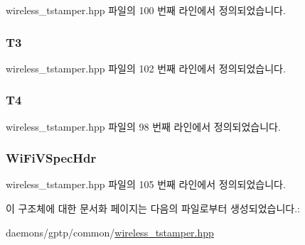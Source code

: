wireless\+\_\+tstamper.\+hpp 파일의 100 번째 라인에서 정의되었습니다.

\subsubsection[{\texorpdfstring{T3}{T3}}]{ T3}\hypertarget{struct___t_i_m_i_n_g_m_s_m_t___e_v_e_n_t___d_a_t_a_a65706e8b8f5797245ebc879fa8ef65b6}{}\label{struct___t_i_m_i_n_g_m_s_m_t___e_v_e_n_t___d_a_t_a_a65706e8b8f5797245ebc879fa8ef65b6}


wireless\+\_\+tstamper.\+hpp 파일의 102 번째 라인에서 정의되었습니다.

\subsubsection[{\texorpdfstring{T4}{T4}}]{ T4}\hypertarget{struct___t_i_m_i_n_g_m_s_m_t___e_v_e_n_t___d_a_t_a_a8cea6315d4cb7873c4a4440330e6453f}{}\label{struct___t_i_m_i_n_g_m_s_m_t___e_v_e_n_t___d_a_t_a_a8cea6315d4cb7873c4a4440330e6453f}


wireless\+\_\+tstamper.\+hpp 파일의 98 번째 라인에서 정의되었습니다.

\subsubsection[{\texorpdfstring{Wi\+Fi\+V\+Spec\+Hdr}{WiFiVSpecHdr}}]{ Wi\+Fi\+V\+Spec\+Hdr}\hypertarget{struct___t_i_m_i_n_g_m_s_m_t___e_v_e_n_t___d_a_t_a_a833245209a0ea1388cc5eda2f9aacf4d}{}\label{struct___t_i_m_i_n_g_m_s_m_t___e_v_e_n_t___d_a_t_a_a833245209a0ea1388cc5eda2f9aacf4d}


wireless\+\_\+tstamper.\+hpp 파일의 105 번째 라인에서 정의되었습니다.



이 구조체에 대한 문서화 페이지는 다음의 파일로부터 생성되었습니다.\+:\begin{DoxyCompactItemize}
\item 
daemons/gptp/common/\hyperlink{wireless__tstamper_8hpp}{wireless\+\_\+tstamper.\+hpp}\end{DoxyCompactItemize}
